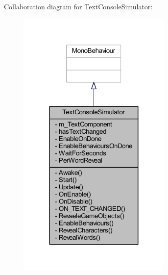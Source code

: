 Collaboration diagram for Text\+Console\+Simulator\+:
\nopagebreak
\begin{figure}[H]
\begin{center}
\leavevmode
\includegraphics[width=215pt]{class_text_console_simulator__coll__graph}
\end{center}
\end{figure}
